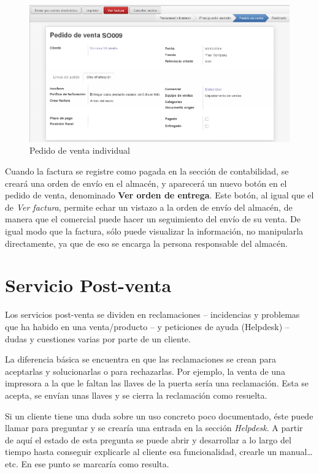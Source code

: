 \begin{figure}[H]
\includegraphics[width=\textwidth]{ventas/img/ven_pedindividual.png}
\caption{Pedido de venta individual}
\label{ven:pedindividual}
\end{figure}

Cuando la factura se registre como pagada en la sección de contabilidad, se creará una orden de envío en el almacén, y aparecerá un nuevo
botón en el pedido de venta, denominado \textbf{Ver orden de entrega}. Este botón, al igual que el de \emph{Ver factura}, permite echar un
vistazo a la orden de envío del almacén, de manera que el comercial puede hacer un seguimiento del envío de su venta. De igual modo que la
factura, sólo puede visualizar la información, no manipularla directamente, ya que de eso se encarga la persona responsable del almacén.




\section{Servicio Post-venta}

Los servicios post-venta se dividen en reclamaciones -- incidencias y problemas que ha habido en una venta/producto -- y peticiones de ayuda (Helpdesk) -- dudas y cuestiones varias por parte de un cliente.

La diferencia básica se encuentra en que las reclamaciones se crean para aceptarlas y solucionarlas o para rechazarlas. Por ejemplo, la
venta de una impresora a la que le faltan las llaves de la puerta sería una reclamación. Esta se acepta, se envían unas llaves y se cierra
la reclamación como resuelta.

Si un cliente tiene una duda sobre un uso concreto poco documentado, éste puede llamar para preguntar y se crearía una entrada en la
sección \emph{Helpdesk}. A partir de aquí el estado de esta pregunta se puede abrir y desarrollar a lo largo del tiempo hasta conseguir
explicarle al cliente esa funcionalidad, crearle un manual\ldots etc. En ese punto se marcaría como resulta.


